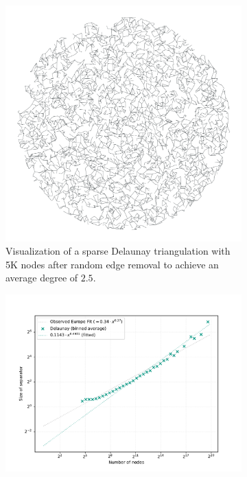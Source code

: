 \begin{figure}[tbhp]
    \centering
    \begin{subfigure}{0.35\linewidth}
        \centering
        \includegraphics[width=\linewidth]{graphics/delaunay_avg_deg.png}
        \caption{Visualization of a sparse Delaunay triangulation with 5K nodes after random edge removal to achieve an average degree of \(2.5\).}
        \label{fig:sparse_delaunay_viz}
    \end{subfigure}
    \hfill
    \begin{subfigure}{0.55\linewidth}
        \centering
        \includegraphics[width=\linewidth]{graphics/sep_delaunay_avg_deg.png}

\end{subfigure}
\end{figure}

